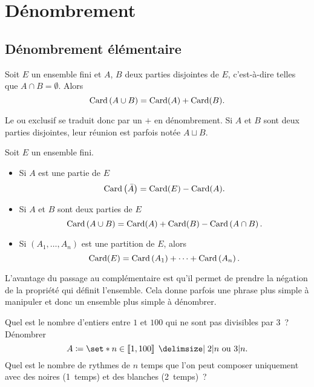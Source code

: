 \documentclass{magnolia}
\begin{document}
\section{Dénombrement}

\subsection{Dénombrement élémentaire}

\begin{proposition}
Soit $E$ un ensemble fini et $A$, $B$ deux parties disjointes de $E$, c'est-à-dire telles
que $A\cap B=\emptyset$. Alors
\[\operatorname{Card}\left(A\cup B\right)=\operatorname{Card} (A)+\operatorname{Card}(B).\]
\end{proposition}

\begin{remarques}
\remarque Le \og ou exclusif \fg se traduit donc par un $ + $ en dénombrement.
\remarque Si $A$ et $B$ sont deux parties disjointes, leur réunion est parfois notée $A\sqcup B$.
\end{remarques}

\begin{proposition}
Soit $E$ un ensemble fini.
\begin{itemize}
\item Si $A$ est une partie de $E$
  \[\operatorname{Card}\left(\bar{A}\right)=\operatorname{Card}(E)-\operatorname{Card}(A).\]
\item Si $A$ et $B$ sont deux parties de $E$
  \[\operatorname{Card}\left(A\cup B\right)=\operatorname{Card}(A)+\operatorname{Card}(B)-\operatorname{Card}\left(A\cap B\right).\]
\item Si $(A_1,\ldots,A_n)$ est une partition de $E$, alors
  \[\operatorname{Card}(E)=\operatorname{Card}\left(A_1\right)+\cdots+\operatorname{Card}\left(A_n\right).\]
\end{itemize}
\end{proposition}



\begin{remarqueUnique}
\remarque L'avantage du passage au complémentaire est qu'il permet de prendre la négation
  de la propriété qui définit l'ensemble. Cela donne parfois une phrase plus simple à
  manipuler et donc un ensemble plus simple à dénombrer.
\end{remarqueUnique}

\begin{exos}
\exo Quel est le nombre d'entiers entre $1$ et $100$ qui ne sont pas divisibles par $3$~?
\exo Dénombrer \[A\defeq\enstq{n \in \intere{1}{100}}{2 |n \text{ ou } 3 |n}.\]
\exo Quel est le nombre de rythmes de $n$ temps que l'on peut composer uniquement avec
  des noires (1~temps) et des blanches (2~temps)~?
\end{exos}
\end{document}
